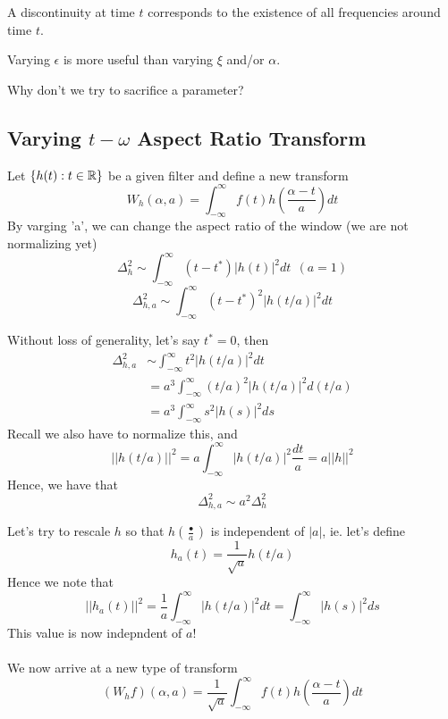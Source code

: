 \documentclass{article}
\begin{document}
A discontinuity at time $t$ corresponds to the existence of all frequencies around time $t$.

\begin{claim}
Varying $\epsilon$ is more useful than varying $\xi$ and/or $\alpha$.
\end{claim}

\begin{question}
    Why don't we try to sacrifice a parameter?
\end{question}

\subsection{Varying $t-\omega$ Aspect Ratio Transform}

Let $\{h(t): t \in \mathbb{R}\}$ be a given filter and define a new transform
\[W_h(\alpha, a) = \int_{-\infty}^\infty f(t) h(\frac{\alpha - t}{a}) dt\]
By varging 'a', we can change the aspect ratio of the window (we are not normalizing yet)
\[\Delta_h^2 \sim \int_{-\infty}^\infty (t - t^*) |h(t)|^2 dt\ \ (a = 1)\]
\[\Delta_{h, a}^2 \sim \int_{-\infty}^\infty (t - t^*)^2 |h(t/a)|^2 dt\]

Without loss of generality, let's say $t^* = 0$, then
\begin{align*}
    \Delta_{h, a}^2 &\sim \int_{-\infty}^\infty t^2 |h(t/a)|^2 dt\\
    &=a^3 \int_{-\infty}^\infty (t/a)^2 |h(t/a)|^2 d(t/a)\\
    &= a^3 \int_{-\infty}^\infty s^2 |h(s)|^2 ds
\end{align*}
Recall we also have to normalize this, and
\[||h(t/a)||^2 = a \int_{-\infty}^\infty |h(t/a)|^2 \frac{dt}{a} = a ||h||^2\]
Hence, we have that
\[\Delta_{h, a}^2 \sim a^2 \Delta_h^2\]

Let's try to rescale $h$ so that $h(\frac{\bullet}{a})$ is independent of $|a|$, ie. let's define
\[h_a(t) = \frac{1}{\sqrt{a}} h(t/a)\]
Hence we note that
\[||h_a(t)||^2 = \frac{1}{a} \int_{-\infty}^\infty |h(t/a)|^2 dt = \int_{-\infty}^\infty |h(s)|^2 ds\]
This value is now indepndent of $a$!\\\\

We now arrive at a new type of transform
\[(W_h f)(\alpha, a) = \frac{1}{\sqrt{a}} \int_{-\infty}^\infty f(t) h(\frac{\alpha - t}{a}) dt\]
\end{document}
